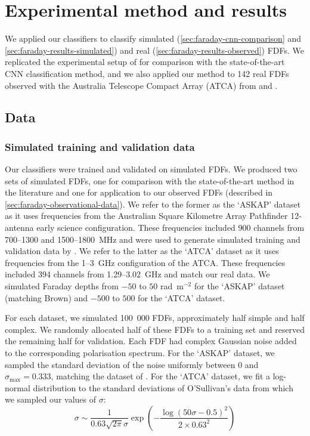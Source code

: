 \section{Experimental method and results}
\label{sec:faraday-experiment-classification}

  We applied our classifiers to classify simulated (\autoref{sec:faraday-cnn-comparison} and \ref{sec:faraday-results-simulated}) and real (\autoref{sec:faraday-results-observed}) FDFs. We replicated the experimental setup of \citet{brown_classifying_2018} for comparison with the state-of-the-art CNN classification method, and we also applied our method to 142 real FDFs observed with the Australia Telescope Compact Array (ATCA) from \citet{livingston21faraday} and \citet{osullivan_broad-band_2017}.

  \subsection{Data}

  \subsubsection{Simulated training and validation data}
  \label{sec:faraday-simulated-training-data}

    Our classifiers were trained and validated on simulated FDFs. We produced two sets of simulated FDFs, one for comparison with the state-of-the-art method in the literature and one for application to our observed FDFs (described in \autoref{sec:faraday-observational-data}). We refer to the former as the `ASKAP' dataset as it uses frequencies from the Australian Square Kilometre Array Pathfinder 12-antenna early science configuration. These frequencies included 900 channels from 700--1300 and 1500--1800~MHz and were used to generate simulated training and validation data by \citet{brown_classifying_2018}. We refer to the latter as the `ATCA' dataset as it uses frequencies from the 1--3~GHz configuration of the ATCA. These frequencies included 394 channels from 1.29--3.02~GHz and match our real data. We simulated Faraday depths from $-50$ to $50$ rad~m$^{-2}$ for the `ASKAP' dataset (matching Brown) and $-500$ to $500$ for the `ATCA' dataset.

    For each dataset, we simulated 100~000 FDFs, approximately half simple and half complex. We randomly allocated half of these FDFs to a training set and reserved the remaining half for validation. Each FDF had complex Gaussian noise added to the corresponding polarisation spectrum. For the `ASKAP' dataset, we sampled the standard deviation of the noise uniformly between 0 and $\sigma_{\max} = 0.333$, matching the dataset of \citet{brown_classifying_2018}.
    For the `ATCA' dataset, we fit a log-normal distribution to the standard deviations of O'Sullivan's data \citep{osullivan_broad-band_2017} from which we sampled our values of $\sigma$:
    \begin{equation}
      \sigma \sim \frac{1}{0.63 \sqrt{2 \pi} \sigma} \exp \left(-\frac{\log\left(50 \sigma - 0.5\right)^2}{2 \times 0.63^2}\right)
    \end{equation}


